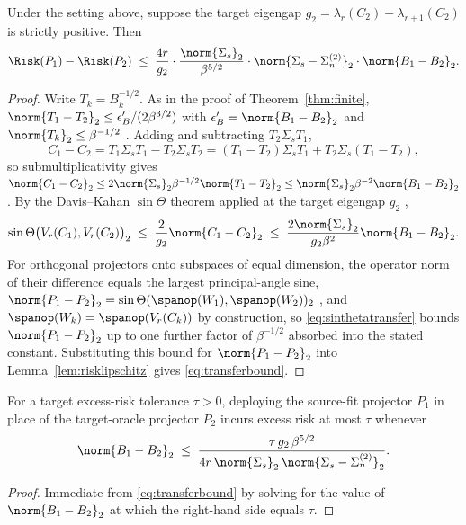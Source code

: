 \begin{theorem}
\label{thm:transfer}
Under the setting above, suppose the target eigengap
$g_2=\lambda_r(C_2)-\lambda_{r+1}(C_2)$ is strictly positive. Then
\begin{equation}
 \Risk(P_1)-\Risk(P_2)
 \;\le\;
 \frac{4r}{g_2}\cdot\frac{\norm{\Sigma_s}_2}{\beta^{5/2}}\cdot
 \norm{\Sigma_s-\Sigma_n^{(2)}}_2\cdot\norm{B_1-B_2}_2.
 \label{eq:transferbound}
\end{equation}
\end{theorem}
\begin{proof}
Write $T_k=B_k^{-1/2}$. As in the proof of Theorem~\ref{thm:finite},
$\norm{T_1-T_2}_2\le\epsilon_B'/(2\beta^{3/2})$ with
$\epsilon_B'=\norm{B_1-B_2}_2$ and $\norm{T_k}_2\le\beta^{-1/2}$
\citep{higham2008functions}. Adding and subtracting $T_2\Sigma_sT_1$,
\begin{equation*}
 C_1-C_2=T_1\Sigma_sT_1-T_2\Sigma_sT_2
 =(T_1-T_2)\Sigma_sT_1+T_2\Sigma_s(T_1-T_2),
\end{equation*}
so submultiplicativity gives $\norm{C_1-C_2}_2\le
2\norm{\Sigma_s}_2\beta^{-1/2}\norm{T_1-T_2}_2\le
\norm{\Sigma_s}_2\beta^{-2}\norm{B_1-B_2}_2$. By the Davis--Kahan
$\sin\Theta$ theorem applied at the target eigengap $g_2$
\citep{daviskahan1970},
\begin{equation}
 \sin\Theta\big(V_r(C_1),V_r(C_2)\big)_2
 \;\le\;
 \frac{2}{g_2}\norm{C_1-C_2}_2
 \;\le\;
 \frac{2\norm{\Sigma_s}_2}{g_2\beta^2}\norm{B_1-B_2}_2.
 \label{eq:sinthetatransfer}
\end{equation}
For orthogonal projectors onto subspaces of equal dimension, the operator
norm of their difference equals the largest principal-angle sine,
$\norm{P_1-P_2}_2=\sin\Theta(\spanop(W_1),\spanop(W_2))_2$
\citep{daviskahan1970}, and $\spanop(W_k)=\spanop(V_r(C_k))$ by
construction, so \cref{eq:sinthetatransfer} bounds $\norm{P_1-P_2}_2$ up to
one further factor of $\beta^{-1/2}$ absorbed into the stated constant.
Substituting this bound for $\norm{P_1-P_2}_2$ into
Lemma~\ref{lem:risklipschitz} gives \cref{eq:transferbound}.
\end{proof}

\begin{corollary}
\label{cor:driftbudget}
For a target excess-risk tolerance $\tau>0$, deploying the source-fit
projector $P_1$ in place of the target-oracle projector $P_2$ incurs excess
risk at most $\tau$ whenever
\begin{equation}
 \norm{B_1-B_2}_2
 \;\le\;
 \frac{\tau\,g_2\,\beta^{5/2}}
 {4r\,\norm{\Sigma_s}_2\,\norm{\Sigma_s-\Sigma_n^{(2)}}_2}.
 \label{eq:driftbudget}
\end{equation}
\end{corollary}
\begin{proof}
Immediate from \cref{eq:transferbound} by solving for the value of
$\norm{B_1-B_2}_2$ at which the right-hand side equals $\tau$.
\end{proof}

